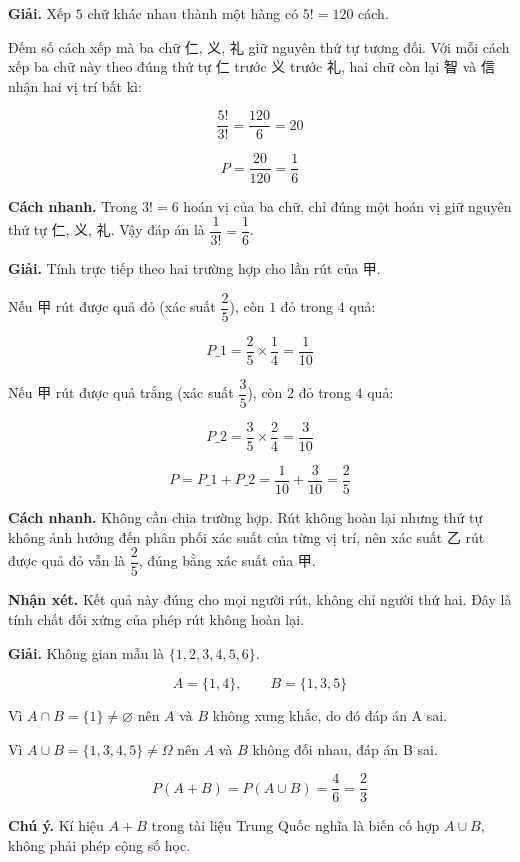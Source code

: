 \documentclass[11pt, a4paper]{article}
\begin{document}
\begin{dapan}[4 — Đáp án D]
\textbf{Giải.} Xếp $5$ chữ khác nhau thành một hàng có $5! = 120$ cách.

Đếm số cách xếp mà ba chữ 仁, 义, 礼 giữ nguyên thứ tự tương đối. Với mỗi cách xếp ba chữ này theo đúng thứ tự 仁 trước 义 trước 礼, hai chữ còn lại 智 và 信 nhận hai vị trí bất kì:

$$\frac{5!}{3!} = \frac{120}{6} = 20$$

$$P = \frac{20}{120} = \frac{1}{6}$$

\textbf{Cách nhanh.} Trong $3! = 6$ hoán vị của ba chữ, chỉ đúng một hoán vị giữ nguyên thứ tự 仁, 义, 礼. Vậy đáp án là $\dfrac{1}{3!} = \dfrac{1}{6}$.
\end{dapan}

\begin{dapan}[5 — Đáp án A]
\textbf{Giải.} Tính trực tiếp theo hai trường hợp cho lần rút của 甲.

Nếu 甲 rút được quả đỏ (xác suất $\dfrac{2}{5}$), còn $1$ đỏ trong $4$ quả:

$$P\_1 = \frac{2}{5} \times \frac{1}{4} = \frac{1}{10}$$

Nếu 甲 rút được quả trắng (xác suất $\dfrac{3}{5}$), còn $2$ đỏ trong $4$ quả:

$$P\_2 = \frac{3}{5} \times \frac{2}{4} = \frac{3}{10}$$

$$P = P\_1 + P\_2 = \frac{1}{10} + \frac{3}{10} = \frac{2}{5}$$

\textbf{Cách nhanh.} Không cần chia trường hợp. Rút không hoàn lại nhưng thứ tự không ảnh hưởng đến phân phối xác suất của từng vị trí, nên xác suất 乙 rút được quả đỏ vẫn là $\dfrac{2}{5}$, đúng bằng xác suất của 甲.

\textbf{Nhận xét.} Kết quả này đúng cho mọi người rút, không chỉ người thứ hai. Đây là tính chất đối xứng của phép rút không hoàn lại.
\end{dapan}

\begin{dapan}[6 — Đáp án C]
\textbf{Giải.} Không gian mẫu là $\{1,2,3,4,5,6\}$.

$$A = \{1, 4\}, \qquad B = \{1, 3, 5\}$$

Vì $A \cap B = \{1\} \neq \varnothing$ nên $A$ và $B$ không xung khắc, do đó đáp án A sai.

Vì $A \cup B = \{1,3,4,5\} \neq \Omega$ nên $A$ và $B$ không đối nhau, đáp án B sai.

$$P(A + B) = P(A \cup B) = \frac{4}{6} = \frac{2}{3}$$

\textbf{Chú ý.} Kí hiệu $A + B$ trong tài liệu Trung Quốc nghĩa là biến cố hợp $A \cup B$, không phải phép cộng số học.
\end{dapan}
\end{document}
